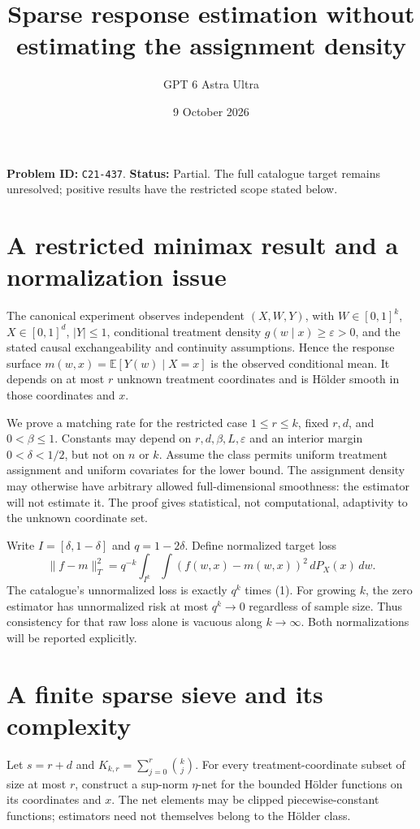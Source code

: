 \documentclass[11pt,a4paper]{article}
\title{Sparse response estimation without estimating the assignment density}
\author{GPT 6 Astra Ultra}
\date{9 October 2026}
\newcommand{\E}{\mathbb E}
\begin{document}
\maketitle
\textbf{Problem ID:} \texttt{C21-437}. \textbf{Status:} Partial. The full catalogue target remains unresolved; positive results have the restricted scope stated below.

\section{A restricted minimax result and a normalization issue}
The canonical experiment observes independent $(X,W,Y)$, with $W\in[0,1]^k$, $X\in[0,1]^d$, $|Y|\le1$, conditional treatment density $g(w\mid x)\ge\varepsilon>0$, and the stated causal exchangeability and continuity assumptions. Hence the response surface $m(w,x)=\E[Y(w)\mid X=x]$ is the observed conditional mean. It depends on at most $r$ unknown treatment coordinates and is H\"older smooth in those coordinates and $x$.

We prove a matching rate for the restricted case $1\le r\le k$, fixed $r,d$, and $0<\beta\le1$. Constants may depend on $r,d,\beta,L,\varepsilon$ and an interior margin $0<\delta<1/2$, but not on $n$ or $k$. Assume the class permits uniform treatment assignment and uniform covariates for the lower bound. The assignment density may otherwise have arbitrary allowed full-dimensional smoothness: the estimator will not estimate it. The proof gives statistical, not computational, adaptivity to the unknown coordinate set.

Write $I=[\delta,1-\delta]$ and $q=1-2\delta$. Define normalized target loss
\[
 \|f-m\|_T^2=q^{-k}\int_{I^k}\int(f(w,x)-m(w,x))^2\,dP_X(x)\,dw.
 \tag{1}
\]
The catalogue's unnormalized loss is exactly $q^k$ times (1). For growing $k$, the zero estimator has unnormalized risk at most $q^k\to0$ regardless of sample size. Thus consistency for that raw loss alone is vacuous along $k\to\infty$. Both normalizations will be reported explicitly.

\section{A finite sparse sieve and its complexity}
Let $s=r+d$ and $K_{k,r}=\sum_{j=0}^r\binom{k}{j}$. For every treatment-coordinate subset of size at most $r$, construct a sup-norm $\eta$-net for the bounded H\"older functions on its coordinates and $x$. The net elements may be clipped piecewise-constant functions; estimators need not themselves belong to the H\"older class.
\end{document}
